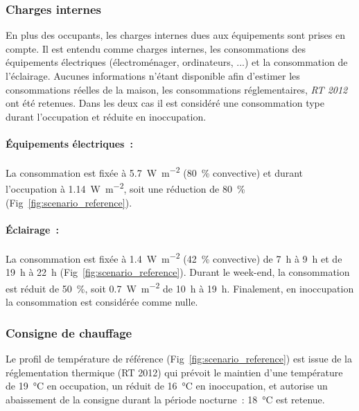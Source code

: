 \subsubsection{Charges internes} %
\label{ssub:charges_internes}
En plus des occupants, les charges internes dues aux équipements sont prises en compte. Il
est entendu comme charges internes, les consommations des équipements électriques
(électroménager, ordinateurs, ...) et la consommation de l’éclairage. Aucunes informations
n’étant disponible afin d’estimer les consommations réelles de la maison, les
consommations réglementaires, \emph{RT 2012} \parencite{CSTB2011} ont été retenues.
Dans les deux cas il est considéré une consommation type durant l’occupation
et réduite en inoccupation.

\paragraph{Équipements électriques~:} %
\label{par:equipements_electriques}
La consommation est fixée à \SI{5.7}{\watt\per m^{2}} (\SI{80}{\percent}
convective) et durant l’occupation à \SI{1.14}{\watt\per m^{2}}, soit une
réduction de \SI{80}{\percent} (Fig~\ref{fig:scenario_reference}).

\paragraph{Éclairage~:} %
\label{par:eclairage}
La consommation est fixée à \SI{1.4}{\watt\per m^{2}} (\SI{42}{\percent} convective) de
\SI{7}{\hour} à \SI{9}{\hour} et de \SI{19}{\hour} à \SI{22}{\hour}
(Fig~\ref{fig:scenario_reference}). Durant le week-end, la consommation est réduit de
\SI{50}{\percent}, soit \SI{0.7}{\watt\per m^{2}} de \SI{10}{\hour} à \SI{19}{\hour}.
Finalement, en inoccupation la consommation est considérée comme nulle.


\subsubsection{Consigne de chauffage} %
\label{ssub:consigne_de_chauffage}
Le profil de température de référence (Fig~\ref{fig:scenario_reference}) est issue de la
réglementation thermique (RT 2012) qui prévoit le maintien d’une température de
\SI{19}{\celsius} en occupation, un réduit de \SI{16}{\celsius} en inoccupation, et
autorise un abaissement de la consigne durant la période nocturne~: \SI{18}{\celsius} est
retenue.

